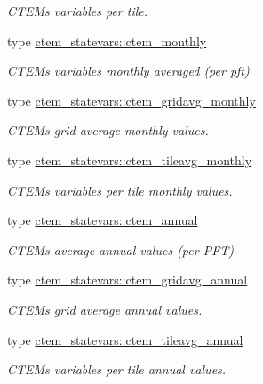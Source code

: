 \begin{DoxyCompactItemize}
\begin{DoxyCompactList}\small\item\em C\+T\+E\+M\textquotesingle{}s variables per tile. \end{DoxyCompactList}\item 
type \hyperlink{structctem__statevars_1_1ctem__monthly}{ctem\+\_\+statevars\+::ctem\+\_\+monthly}
\begin{DoxyCompactList}\small\item\em C\+T\+E\+M\textquotesingle{}s variables monthly averaged (per pft) \end{DoxyCompactList}\item 
type \hyperlink{structctem__statevars_1_1ctem__gridavg__monthly}{ctem\+\_\+statevars\+::ctem\+\_\+gridavg\+\_\+monthly}
\begin{DoxyCompactList}\small\item\em C\+T\+E\+M\textquotesingle{}s grid average monthly values. \end{DoxyCompactList}\item 
type \hyperlink{structctem__statevars_1_1ctem__tileavg__monthly}{ctem\+\_\+statevars\+::ctem\+\_\+tileavg\+\_\+monthly}
\begin{DoxyCompactList}\small\item\em C\+T\+E\+M\textquotesingle{}s variables per tile monthly values. \end{DoxyCompactList}\item 
type \hyperlink{structctem__statevars_1_1ctem__annual}{ctem\+\_\+statevars\+::ctem\+\_\+annual}
\begin{DoxyCompactList}\small\item\em C\+T\+E\+M\textquotesingle{}s average annual values (per P\+F\+T) \end{DoxyCompactList}\item 
type \hyperlink{structctem__statevars_1_1ctem__gridavg__annual}{ctem\+\_\+statevars\+::ctem\+\_\+gridavg\+\_\+annual}
\begin{DoxyCompactList}\small\item\em C\+T\+E\+M\textquotesingle{}s grid average annual values. \end{DoxyCompactList}\item 
type \hyperlink{structctem__statevars_1_1ctem__tileavg__annual}{ctem\+\_\+statevars\+::ctem\+\_\+tileavg\+\_\+annual}
\begin{DoxyCompactList}\small\item\em C\+T\+E\+M\textquotesingle{}s variables per tile annual values. \end{DoxyCompactList}\end{DoxyCompactItemize}
